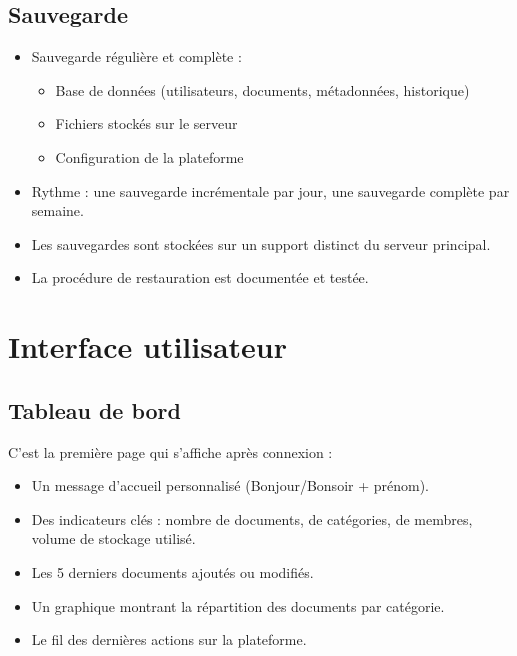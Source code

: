 \documentclass[a4paper,12pt,french]{article}
\begin{document}
\subsection{Sauvegarde}

\begin{itemize}[leftmargin=1.5em]
  \item Sauvegarde régulière et complète :
    \begin{itemize}
      \item Base de données (utilisateurs, documents, métadonnées, historique)
      \item Fichiers stockés sur le serveur
      \item Configuration de la plateforme
    \end{itemize}
  \item Rythme : une sauvegarde incrémentale par jour, une sauvegarde complète par semaine.
  \item Les sauvegardes sont stockées sur un support distinct du serveur principal.
  \item La procédure de restauration est documentée et testée.
\end{itemize}


\section{Interface utilisateur}

\subsection{Tableau de bord}

C'est la première page qui s'affiche après connexion :

\begin{itemize}[leftmargin=1.5em]
  \item Un message d'accueil personnalisé (Bonjour/Bonsoir + prénom).
  \item Des indicateurs clés : nombre de documents, de catégories, de membres, volume de stockage utilisé.
  \item Les 5 derniers documents ajoutés ou modifiés.
  \item Un graphique montrant la répartition des documents par catégorie.
  \item Le fil des dernières actions sur la plateforme.
\end{itemize}
\end{document}

